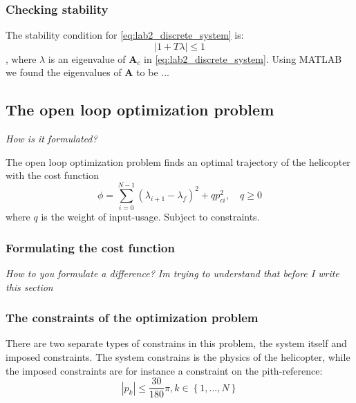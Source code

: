 \documentclass[../main.tex]{subfiles}
\begin{document}
\subsubsection{Checking stability}
The stability condition for \cref{eq:lab2_discrete_system} is:
\begin{equation}\label{eq:lab2_stab_condition}
	|1 + T \lambda| \leq 1
\end{equation}, where $ \lambda $ is an eigenvalue of $ \bm A_c $ in \cref{eq:lab2_discrete_system}. 
Using MATLAB we found the eigenvalues of $ \bm A $ to be ... 

\subsection{The open loop optimization problem}
\textit{How is it formulated?}

The open loop optimization problem finds an optimal trajectory of the helicopter with the cost function
\begin{equation}
	\phi = \sum_{i=0}^{N-1} \left( \lambda_{i+1} - \lambda_f \right)^2 + qp_{ci}^2 , \quad q \ge 0
\end{equation}
where $q$ is the weight of input-usage. Subject to constraints.

\subsubsection{Formulating the cost function}
\textit{How to you formulate a difference? Im trying to understand that before I write this section}

\subsubsection{The constraints of the optimization problem}
There are two separate types of constrains in this problem, the system itself and imposed constraints. The system constrains is the physics of the helicopter, while the imposed constraints are for instance a constraint on the pith-reference:
\begin{equation}
	\left\lvert p_k \right\rvert \le \frac{30}{180} \pi, k \in \left\{ 1, ..., N \right\} 
\end{equation}
\end{document}
